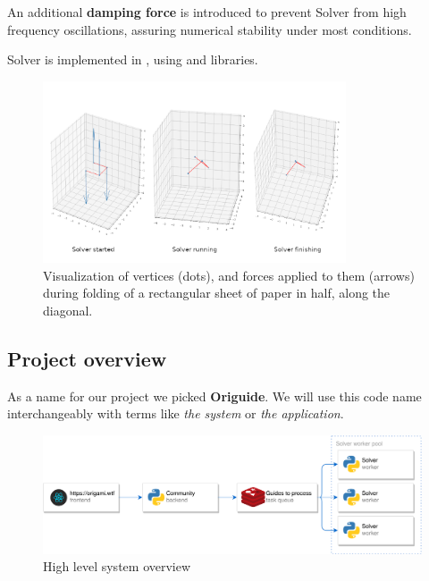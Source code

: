 An additional \textbf{damping force} is introduced to prevent Solver from
high frequency oscillations, assuring numerical stability under most conditions.
\smallskip

Solver is implemented in , using  and  libraries. 


\begin{figure}[H]
	\caption{Visualization of vertices (dots), and forces applied to them (arrows)
	during folding of a rectangular sheet of paper in half, along the diagonal. }
  \centering
    \includegraphics[width=0.8\textwidth]{assets/prototype-backend.png}
\end{figure}


\subsection{Project overview}
\label{section:project-overview}

As a name for our project we picked \textbf{Origuide}.
We will use this code name interchangeably with terms like \textit{the system} or \textit{the application}.
\smallskip

\begin{figure}[H]
	\caption{High level system overview}
  \centering
    \includegraphics[width=\textwidth]{assets/architecture.png}
\end{figure}

